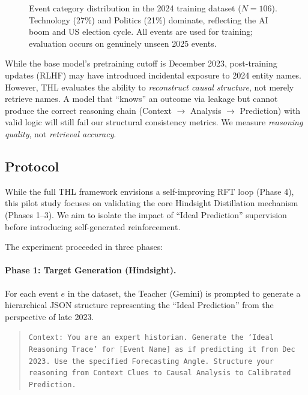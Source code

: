 \documentclass[11pt,a4paper]{article}
\begin{document}
\begin{figure}[htbp]
\centering
{}
\caption{Event category distribution in the 2024 training dataset ($N=106$). Technology (27\%) and Politics (21\%) dominate, reflecting the AI boom and US election cycle. All events are used for training; evaluation occurs on genuinely unseen 2025 events.}
\label{fig:category_dist}
\end{figure}

\medskip\noindent
While the base model's pretraining cutoff is December 2023, post-training updates (RLHF) may have introduced incidental exposure to 2024 entity names. However, THL evaluates the ability to \textit{reconstruct causal structure}, not merely retrieve names. A model that ``knows'' an outcome via leakage but cannot produce the correct reasoning chain (Context $\to$ Analysis $\to$ Prediction) with valid logic will still fail our structural consistency metrics. We measure \textit{reasoning quality}, not \textit{retrieval accuracy}.

\subsection{Protocol}

While the full THL framework envisions a self-improving RFT loop (Phase 4), this pilot study focuses on validating the core Hindsight Distillation mechanism (Phases 1--3). We aim to isolate the impact of ``Ideal Prediction'' supervision before introducing self-generated reinforcement.

The experiment proceeded in three phases:

\paragraph{Phase 1: Target Generation (Hindsight).}
For each event $e$ in the dataset, the Teacher (Gemini) is prompted to generate a hierarchical JSON structure representing the ``Ideal Prediction'' from the perspective of late 2023.
\begin{quote}
    \small \texttt{Context: You are an expert historian. Generate the `Ideal Reasoning Trace' for [Event Name] as if predicting it from Dec 2023. Use the specified Forecasting Angle. Structure your reasoning from Context Clues to Causal Analysis to Calibrated Prediction.}
\end{quote}
\end{document}
